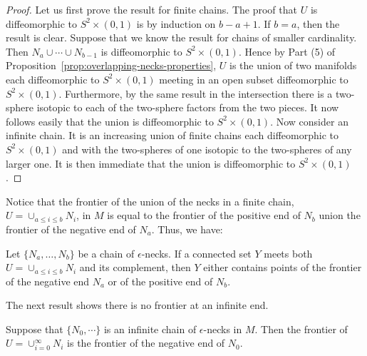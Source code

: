 \begin{proof}
Let us first prove the result for finite chains. The proof that $U$
is diffeomorphic to $S^2\times (0,1)$ is by induction on $b-a+1$. If
$b=a$, then the result is clear. Suppose that we know the result for
chains of smaller cardinality. Then $N_a\cup\cdots\cup N_{b-1}$ is
diffeomorphic to $S^2\times (0,1)$. Hence by Part (5) of
Proposition~\ref{prop:overlapping-necks-properties}, $U$ is the union of two manifolds
each diffeomorphic to $S^2\times (0,1)$ meeting in an open subset
diffeomorphic to $S^2\times (0,1)$. Furthermore, by the same result
 in the intersection there is a two-sphere isotopic to each of the
two-sphere factors from the two pieces.  It now follows easily that
the union is diffeomorphic to $S^2\times (0,1)$. Now consider an
infinite chain. It is an increasing union of finite chains each
diffeomorphic to $S^2\times (0,1)$ and with the two-spheres of one
isotopic to the two-spheres of any larger one. It is then immediate
that the union is diffeomorphic to $S^2\times (0,1)$.
\end{proof}

Notice that the frontier of the union of the necks in a finite
chain, $U=\cup_{a\le i\le b}N_i$, in $M$ is equal to the frontier of
the positive end of $N_b$ union the frontier of the negative end of
$N_a$. Thus, we have:

\begin{corollary}
\label{cor:chain-frontier}
\label{chainfrontier}
Let $\{N_a,\ldots,N_b\}$ be a chain of $\epsilon$-necks. If a
connected set $Y$ meets both $U=\cup_{a\le i\le b}N_i$ and its
complement, then $Y$ either contains  points of the frontier of the
negative end $N_a$ or of the positive  end of $N_b$.
\end{corollary}


The next result shows there is no frontier at an infinite end.

\begin{lemma}
\label{lem:infinite-chain-frontier}
\label{inffrontier}
Suppose that $\{N_0,\cdots\}$ is an infinite chain of
$\epsilon$-necks in $M$. Then the frontier of $U=\cup_{i=0}^\infty
N_i$ is the frontier of the negative end of $N_0$.
\end{lemma}

